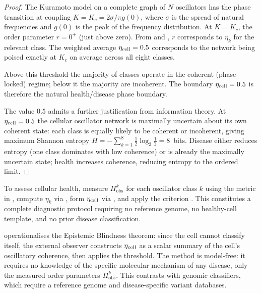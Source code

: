\begin{proof}
The Kuramoto model on a complete graph of $N$ oscillators has the phase
transition at coupling $K = K_c = 2\sigma/\pi g(0)$, where $\sigma$ is the
spread of natural frequencies and $g(0)$ is the peak of the frequency
distribution.  At $K = K_c$, the order parameter $r = 0^+$ (just above zero).
From  and , $r$ corresponds
to $\eta_k$ for the relevant class.  The weighted average $\eta_{\mathrm{cell}} = 0.5$
corresponds to the network being poised exactly at $K_c$ on average across
all eight classes.

Above this threshold the majority of classes operate in the coherent
(phase-locked) regime; below it the majority are incoherent.  The boundary
$\eta_{\mathrm{cell}} = 0.5$ is therefore the natural health/disease phase boundary.

The value $0.5$ admits a further justification from information theory.  At
$\eta_{\mathrm{cell}} = 0.5$ the cellular oscillator network is maximally uncertain about
its own coherent state: each class is equally likely to be coherent or
incoherent, giving maximum Shannon entropy $H = -\sum_{k=1}^{8}
\tfrac{1}{2}\log_2\tfrac{1}{2} = 8$~bits.  Disease either reduces entropy
(one class dominates with low coherence) or is already the maximally uncertain
state; health increases coherence, reducing entropy to the ordered limit.
\end{proof}

\begin{corollary}
\label{cor:diagnostic}
To assess cellular health, measure $\Pi_\mathrm{obs}^k$ for each oscillator
class $k$ using the metric in , compute $\eta_k$ via
, form $\eta_{\mathrm{cell}}$ via , and
apply the criterion .  This constitutes a complete
diagnostic protocol requiring no reference genome, no healthy-cell template, and
no prior disease classification.
\end{corollary}

\begin{remark}
 operationalises the Epistemic Blindness theorem: since
the cell cannot classify itself, the external observer constructs $\eta_{\mathrm{cell}}$ as
a scalar summary of the cell's oscillatory coherence, then applies the
threshold.  The method is model-free: it requires no knowledge of the specific
molecular mechanism of any disease, only the measured order parameters
$\Pi_\mathrm{obs}^k$.  This contrasts with genomic classifiers, which require
a reference genome and disease-specific variant databases.
\end{remark}

